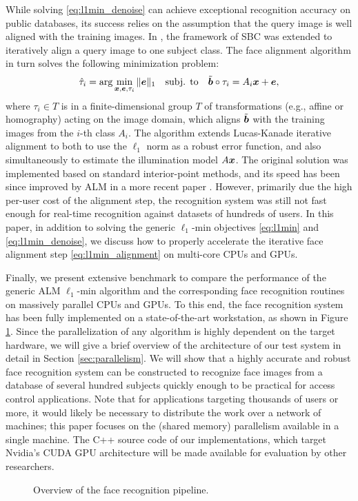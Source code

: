 \documentclass[10pt,twocolumn,letterpaper]{article}
\begin{document}
While solving \eqref{eq:l1min_denoise} can achieve exceptional
recognition accuracy on public databases, its success relies on the assumption
that the query image is well aligned with the training images. In
\cite{WagnerA2009-CVPR}, the framework of SBC was extended to iteratively align
a query image to one subject class. The face alignment algorithm in turn solves
the following minimization problem:
\begin{equation}
\hat{\tau}_i = \arg\min_{{\boldsymbol{x}}, {\boldsymbol{e}}, \tau_i} \|{\boldsymbol{e}}\|_1\quad \mbox{subj. to}\quad \tilde{{\boldsymbol{b}}}\circ\tau_i = A_i{\boldsymbol{x}} + {\boldsymbol{e}},
\label{eq:l1min_alignment}
\end{equation}
where $\tau_i\in T$ is in a finite-dimensional group $T$ of transformations
(e.g., affine or homography) acting on the image domain, which aligns $\tilde{{\boldsymbol{b}}}$
with the training images from the $i$-th class $A_i$. The algorithm 
extends Lucas-Kanade iterative alignment \cite{LucasB1981} to both to use the
$\ell_1$ norm as a robust error function, and also simultaneously 
to estimate the illumination model $A{\boldsymbol{x}}$.  
The original solution \cite{WagnerA2009-CVPR} was implemented based 
on standard interior-point
methods, and its speed has been since improved by ALM in a more recent paper
\cite{WagnerA2011-PAMI}. However, primarily due the high per-user cost
of the alignment step, the recognition system was still not fast enough
for real-time recognition against datasets of hundreds of users.
In this paper, in addition to solving the generic
$\ell_1$-min objectives \eqref{eq:l1min} and \eqref{eq:l1min_denoise}, we 
discuss how to properly accelerate the iterative face alignment step
\eqref{eq:l1min_alignment} on multi-core CPUs and GPUs. 

Finally, we present extensive benchmark to compare the performance of the
generic ALM $\ell_1$-min algorithm and the corresponding face recognition
routines on massively parallel CPUs and GPUs.  To this end, the face
recognition system has been fully implemented on a state-of-the-art
workstation, as shown in Figure \ref{fig:pipeline}. 
Since the parallelization of any algorithm
is highly dependent on the target hardware, we will give a brief overview of
the architecture of our test system in detail in Section
\ref{sec:parallelism}.  We will show that a highly accurate and robust face
recognition system can be constructed to recognize face images from a 
database of several hundred subjects quickly enough to be practical for
access control applications. 
Note that for applications targeting thousands of users or more, it would likely be
necessary to distribute the work over a network of machines; this paper
focuses on the (shared memory) parallelism available in a single machine.
The C++ source code of our implementations, which target Nvidia's CUDA GPU architecture
will be made available for evaluation by other researchers.
\begin{figure}
\centering
{\tiny }
\caption{Overview of the face recognition pipeline.}
\label{fig:pipeline}
\end{figure}
\end{document}
